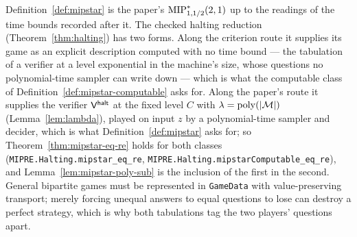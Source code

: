 \begin{remark}
\label{rem:source-mipstar}
Definition~\ref{def:mipstar} is the paper's $\mathrm{MIP}^*_{1,1/2}(2,1)$ up to the readings of the
time bounds recorded after it. The checked halting reduction (Theorem~\ref{thm:halting}) has
two forms. Along the criterion route it supplies its game as an explicit description computed
with no time bound --- the tabulation of a verifier at a level exponential in the machine's
size, whose questions no polynomial-time sampler can write down --- which is what the computable
class of Definition~\ref{def:mipstar-computable} asks for. Along the paper's route it supplies
the verifier $\mathsf{V}^{\mathsf{halt}}$ at the fixed level $C$ with $\lambda = \mathrm{poly}(\left\vert {\mathcal{M}} \right\vert)$
(Lemma~\ref{lem:lambda}), played on input $z$ by a polynomial-time sampler and decider, which is
what Definition~\ref{def:mipstar} asks for; so Theorem~\ref{thm:mipstar-eq-re} holds for both
classes (\texttt{MIPRE.Halting.mipstar\_eq\_re}, \texttt{MIPRE.Halting.mipstarComputable\_eq\_re}),
and Lemma~\ref{lem:mipstar-poly-sub} is the inclusion of the first in the second. General
bipartite games must be represented in
\texttt{GameData} with value-preserving transport; merely forcing unequal answers to equal
questions to lose can destroy a perfect strategy, which is why both tabulations tag the two
players' questions apart.
\end{remark}
